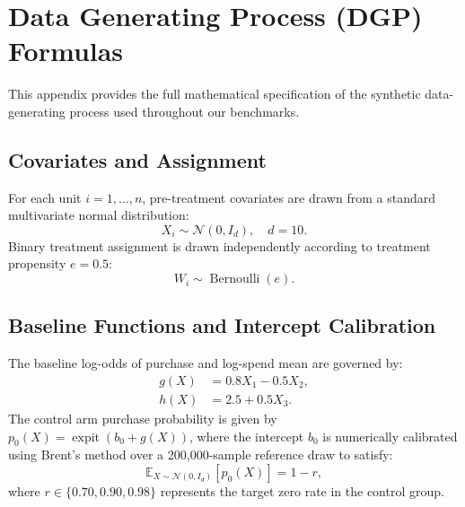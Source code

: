 \documentclass[conference]{IEEEtran}
\newcommand{\E}{\mathbb{E}}
\begin{document}



\newpage
\appendix
\section{Data Generating Process (DGP) Formulas}
\label{app:dgp}

This appendix provides the full mathematical specification of the synthetic data-generating process used throughout our benchmarks.

\subsection{Covariates and Assignment}
For each unit $i = 1, \dots, n$, pre-treatment covariates are drawn from a standard multivariate normal distribution:
\begin{equation}
X_i \sim \mathcal{N}(0, I_d), \quad d=10.
\end{equation}
Binary treatment assignment is drawn independently according to treatment propensity $e = 0.5$:
\begin{equation}
W_i \sim \operatorname{Bernoulli}(e).
\end{equation}

\subsection{Baseline Functions and Intercept Calibration}
The baseline log-odds of purchase and log-spend mean are governed by:
\begin{align}
g(X) &= 0.8 X_1 - 0.5 X_2, \\
h(X) &= 2.5 + 0.5 X_3.
\end{align}
The control arm purchase probability is given by $p_0(X) = \operatorname{expit}(b_0 + g(X))$, where the intercept $b_0$ is numerically calibrated using Brent's method over a 200,000-sample reference draw to satisfy:
\begin{equation}
\E_{X \sim \mathcal{N}(0, I_d)} [p_0(X)] = 1 - r,
\end{equation}
where $r \in \{0.70, 0.90, 0.98\}$ represents the target zero rate in the control group.
\end{document}
